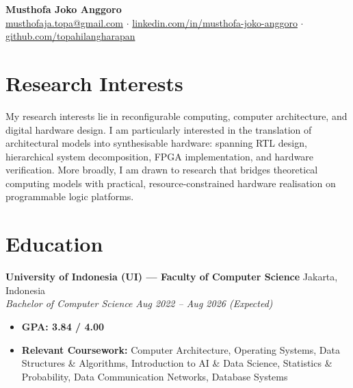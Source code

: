 \documentclass[11pt,a4paper]{article}
\newcommand{\entryheader}[4]{%
    {\small\textbf{#1}} \hfill {\small #2} \\
    {\small\textit{#3}} \hfill {\small\textit{#4}}%
}
\begin{document}
\begin{center}
    {\large\textbf{Musthofa Joko Anggoro}} \\[3pt]
    {\small
        \href{mailto:musthofaja.topa@gmail.com}{musthofaja.topa@gmail.com}
        \enspace$\cdot$\enspace
        \href{https://www.linkedin.com/in/musthofa-joko-anggoro/}{linkedin.com/in/musthofa-joko-anggoro}
        \enspace$\cdot$\enspace
        \href{https://github.com/topahilangharapan}{github.com/topahilangharapan}
    }
\end{center}

\vspace{-2pt}

\section*{Research Interests}

My research interests lie in reconfigurable computing, computer architecture, and digital hardware design. I am particularly interested in the translation of architectural models into synthesisable hardware: spanning RTL design, hierarchical system decomposition, FPGA implementation, and hardware verification. More broadly, I am drawn to research that bridges theoretical computing models with practical, resource-constrained hardware realisation on programmable logic platforms.

\vspace{-4pt}

\section*{Education}

\entryheader{University of Indonesia (UI) --- Faculty of Computer Science}{Jakarta, Indonesia}{Bachelor of Computer Science}{Aug 2022 -- Aug 2026 (Expected)}
\begin{itemize}[leftmargin=1.5em, itemsep=1pt, topsep=2pt]
    \item \textbf{GPA: 3.84 / 4.00}
    \item \textbf{Relevant Coursework:} Computer Architecture, Operating Systems, Data Structures \& Algorithms, Introduction to AI \& Data Science, Statistics \& Probability, Data Communication Networks, Database Systems
\end{itemize}
\end{document}
